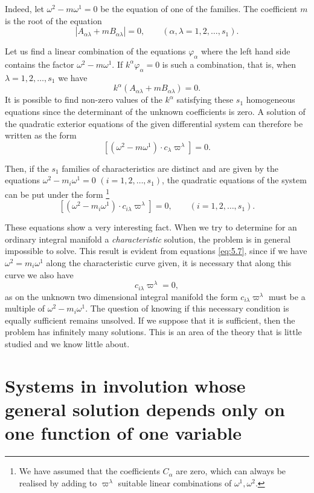 Indeed, let $\omega^{2}-m\omega^{1}=0$ be the equation of one of the families. The coefficient $m$ is the root of the equation
\begin{equation}
  \label{eq:5.6}
  |A_{\alpha\lambda}+mB_{\alpha\lambda}|=0,\qquad(\alpha,\lambda=1,2,\dots,s_{1}).
\end{equation}

Let us find a linear combination of the equations $\varphi_{\alpha}$ where the left hand side contains the factor $\omega^{2}-m\omega^{1}$. If $k^{\alpha}\varphi_{\alpha}=0$ is such a combination, that is, when $\lambda=1,2,\dots,s_{1}$ we have
\[
k^{\alpha}(A_{\alpha\lambda}+mB_{\alpha\lambda})=0.
\]
It is possible to find non-zero values of the $k^{\alpha}$ satisfying these $s_{1}$ homogeneous equations since the determinant of the unknown coefficients is zero. A solution of the quadratic exterior equations of the given differential system can therefore be written as the form
\[
[(\omega^{2}-m\omega^{1})\cdot c_{\lambda}\varpi^{\lambda}]=0.
\]

Then, if the $s_{1}$ families of characteristics are distinct and are given by the equations $\omega^{2}-m_{i}\omega^{1}=0$ $(i=1,2,\dots,s_{1})$, the quadratic equations of the system can be put under the form \footnote{We have assumed that the coefficients $C_{\alpha}$ are zero, which can always be realised by adding to $\varpi^{\lambda}$ suitable linear combinations of $\omega^{1},\omega^{2}$.}
\begin{equation}
\label{eq:5.7}
[(\omega^{2}-m_{i}\omega^{1})\cdot c_{i\lambda}\varpi^{\lambda}]=0,\qquad(i=1,2,\dots,s_{1}).
\end{equation}

These equations show a very interesting fact. When we try to determine for an ordinary integral manifold a \emph{characteristic} solution, the problem is in general impossible to solve. This result is evident from equations \eqref{eq:5.7}, since if we have $\omega^{2}=m_{i}\omega^{1}$ along the characteristic curve given, it is necessary that along this curve we also have
\[
c_{i\lambda}\varpi^{\lambda}=0,
\]
as on the unknown two dimensional integral manifold the form $c_{i \lambda}\varpi^{\lambda}$ must be a multiple of $\omega^{2}-m_{i}\omega^{1}$. The question of knowing if this necessary condition is equally sufficient remains unsolved.  If we suppose that it is sufficient, then the problem has infinitely many solutions. This is an area of the theory that is little studied and we know little about.

\section{Systems in involution whose general solution depends only on one function of one variable}
\label{sec:syst-invol-gener}

